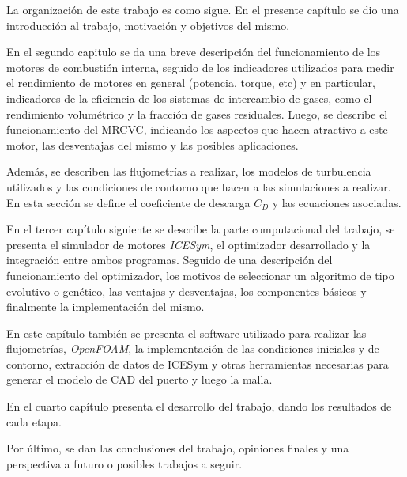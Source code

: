 
La organización de este trabajo es como sigue.
En el presente capítulo se dio una introducción al trabajo, motivación y
objetivos del mismo.

En el segundo capitulo se da una breve descripción del funcionamiento de los
motores de combustión interna, seguido de los indicadores utilizados para medir
el rendimiento de motores en general (potencia, torque, etc) y en particular,
indicadores de la eficiencia de los sistemas de intercambio de gases, como el
rendimiento volumétrico y la fracción de gases residuales.
%
Luego, se describe el funcionamiento del MRCVC, indicando los aspectos que
hacen atractivo a este motor, las desventajas del mismo y las posibles
aplicaciones.

Además, se describen las flujometrías a realizar, los modelos de turbulencia
utilizados y las condiciones de contorno que hacen a las simulaciones a
realizar.
%
En esta sección se define el coeficiente de descarga $C_D$ y las ecuaciones
asociadas.

En el tercer capítulo siguiente se describe la parte computacional del trabajo,
se presenta el simulador de motores \emph{ICESym}, el optimizador desarrollado
y la integración entre ambos programas.
%
Seguido de una descripción del funcionamiento del optimizador, los motivos de
seleccionar un algoritmo de tipo evolutivo o genético, las ventajas y
desventajas, los componentes básicos y finalmente la implementación del mismo.

En este capítulo también se presenta el software utilizado para realizar las
flujometrías, \emph{OpenFOAM}, la implementación de las condiciones iniciales y
de contorno, extracción de datos de ICESym y otras herramientas necesarias para
generar el modelo de CAD del puerto y luego la malla.

En el cuarto capítulo presenta el desarrollo del trabajo, dando los resultados
de cada etapa.

Por último, se dan las conclusiones del trabajo, opiniones finales y una
perspectiva a futuro o posibles trabajos a seguir.


